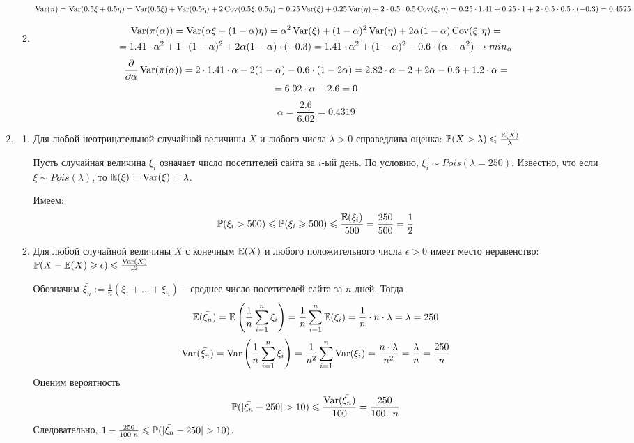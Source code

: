 \documentclass[12pt, a4paper]{article}\usepackage[]{graphicx}\usepackage[]{color}
\begin{document}
\begin{enumerate}
\begin{enumerate}
								$\Var(\pi) = \Var(0.5 \xi + 0.5 \eta) = \Var(0.5 \xi) + \Var(0.5\eta) + 2 \Cov (0.5\xi, 0.5\eta) = 0.25\Var(\xi) + 0.25\Var(\eta) + 2 \cdot 0.5 \cdot 0.5 \Cov(\xi, \eta) = 0.25 \cdot 1.41 + 0.25 \cdot 1 + 2 \cdot 0.5 \cdot 0.5 \cdot (-0.3) = 0.4525$
								\item
								\begin{multline*}
								\Var(\pi(\alpha)) = \Var(\alpha \xi + (1-\alpha)\eta) = \alpha^2\Var(\xi) + (1-\alpha)^2 \Var(\eta) + 2\alpha(1-\alpha) \Cov(\xi, \eta) = \\
								= 1.41 \cdot \alpha^2 + 1\cdot (1-\alpha)^2 + 2\alpha(1-\alpha) \cdot (-0.3) = 1.41 \cdot \alpha^2 + (1-\alpha)^2 - 0.6 \cdot (\alpha - \alpha^2) \to min_\alpha
								\end{multline*}
								\begin{multline*}
								\frac{\partial}{\partial \alpha} \Var(\pi(\alpha)) = 2 \cdot 1.41 \cdot \alpha -2(1-\alpha) -0.6\cdot(1-2\alpha) = 2.82 \cdot \alpha - 2 + 2\alpha - 0.6 + 1.2 \cdot \alpha = \\
								= 6.02 \cdot \alpha - 2.6 = 0
								\end{multline*}
								\[
								\alpha = \frac{2.6}{6.02} = 0.4319
								\]
							\end{enumerate}
							\item \begin{enumerate}
								\item Для любой неотрицательной случайной величины $X$ и любого числа $\lambda > 0$ справедлива оценка: $\P(X>\lambda) \leq \frac{\E(X)}{\lambda}$

								Пусть случайная величина $\xi_i$ означает число посетителей сайта за $i$-ый день. По условию, $\xi_i \sim Pois(\lambda=250)$. Известно, что если $\xi \sim Pois(\lambda)$, то $\E(\xi) = \Var(\xi) = \lambda$.

								Имеем:
								\[
								\P(\xi_i >500) \leq \P(\xi_i \geq 500) \leq \frac{\E(\xi_i)}{500} = \frac{250}{500} = \frac{1}{2}
								\]
								\item Для любой случайной величины $X$ с конечным $\E(X)$ и любого положительного числа $\epsilon > 0$ имеет место неравенство: $\P(X-\E(X)\geq\epsilon)\leq\frac{\Var(X)}{\epsilon^2}$

								Обозначим $\bar{\xi_n} := \frac{1}{n} \left(\xi_1 + \ldots + \xi_n\right)$ – среднее число посетителей сайта за $n$ дней. Тогда
								\[
								\E(\bar{\xi_n}) = \E\left(\frac{1}{n} \sum_{i=1}^{n} \xi_i\right) = \frac{1}{n} \sum_{i=1}^{n} \E(\xi_i) = \frac{1}{n} \cdot n \cdot \lambda = \lambda = 250
								\]
								\[
								\Var(\bar{\xi_n}) = \Var\left(\frac{1}{n} \sum_{i=1}^{n} \xi_i\right) = \frac{1}{n^2} \sum_{i=1}^{n} \Var (\xi_i) = \frac{n \cdot \lambda}{n^2} = \frac{\lambda}{n} = \frac{250}{n}
								\]
								Оценим вероятность
								\[
								\P(\vert\bar{\xi_n}-250\vert > 10) \leq \frac{\Var(\bar{\xi_n})}{100} = \frac{250}{100\cdot n}
								\]
								Следовательно, $1 - \frac{250}{100\cdot n} \leq \P(\vert\bar{\xi_n}-250\vert > 10)$.


\end{enumerate}
\end{enumerate}
\end{document}
